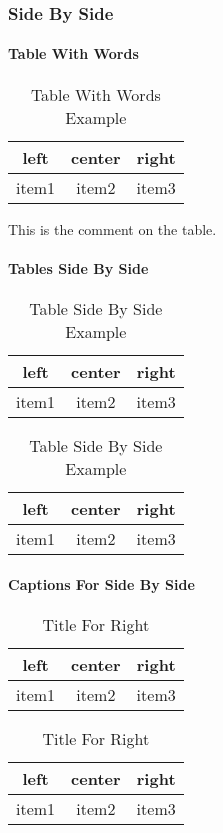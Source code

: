 \subsubsection{Side By Side}
\paragraph{Table With Words}
\begin{table}[H]
    \centering
    \caption{Table With Words Example}
    \begin{tabular}{|c|c|c|}
        \hline
        left & center & right \\ \hline
        item1 & item2 & item3 \\ \hline
    \end{tabular}
    \qquad
    \parbox[b]{0.4\textwidth}{This is the comment on the table.}
\end{table}

\paragraph{Tables Side By Side}
\begin{table}[H]
    \centering
    \caption{Table Side By Side Example}
    \begin{tabular}{|c|c|c|}
        \hline
        left & center & right \\ \hline
        item1 & item2 & item3 \\ \hline
    \end{tabular}
    \qquad
    \begin{tabular}{|c|c|c|}
        \hline
        left & center & right \\ \hline
        item1 & item2 & item3 \\ \hline
    \end{tabular}
\end{table}

\paragraph{Captions For Side By Side}
\begin{table}[H]
    \caption{Title For Both}
    \parbox[b]{0.5\textwidth}{\centering
        \caption{Title For Left}
        \begin{tabular}{|c|c|c|}
            \hline
            left & center & right \\ \hline
            item1 & item2 & item3 \\ \hline
        \end{tabular}}
    \parbox[b]{0.5\textwidth}{\centering
        \caption{Title For Right}
        \begin{tabular}{|c|c|c|}
            \hline
            left & center & right \\ \hline
            item1 & item2 & item3 \\ \hline
        \end{tabular}}
\end{table}

